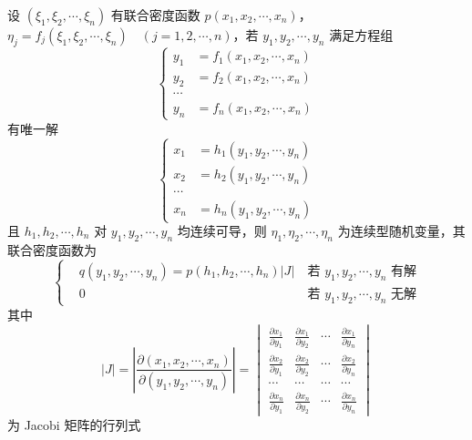 \documentclass[12pt,a4paper]{amsart}
\begin{document}
\begin{proposition}
    设 $(\xi_1, \xi_2, \cdots, \xi_n)$ 有联合密度函数 $p(x_1, x_2, \cdots, x_n)$，$\eta_j = f_j(\xi_1, \xi_2, \cdots, \xi_n)\quad(j = 1,2, \cdots, n)$，若 $y_1, y_2, \cdots, y_n$ 满足方程组
    \begin{equation}
        \left\{
        \begin{aligned}
            y_1 &= f_1(x_1, x_2, \cdots, x_n) \\
            y_2 &= f_2(x_1, x_2, \cdots, x_n) \\
            \cdots \\
            y_n &= f_n(x_1, x_2, \cdots, x_n)
        \end{aligned}
        \right.
    \end{equation}
    有唯一解
    \begin{equation}
        \left\{
        \begin{aligned}
            x_1 &= h_1(y_1, y_2, \cdots, y_n) \\
            x_2 &= h_2(y_1, y_2, \cdots, y_n) \\
            \cdots \\
            x_n &= h_n(y_1, y_2, \cdots, y_n)
        \end{aligned}
        \right.
    \end{equation}
    且 $h_1, h_2, \cdots, h_n$ 对 $y_1, y_2, \cdots, y_n$ 均连续可导，则 $\eta_1, \eta_2, \cdots, \eta_n$ 为连续型随机变量，其联合密度函数为
    \begin{equation}
        \left\{
        \begin{aligned}
            &q(y_1, y_2, \cdots, y_n) = p(h_1, h_2, \cdots, h_n)|J|~&\text{若 $y_1, y_2, \cdots, y_n$ 有解} \\
            &0~&\text{若 $y_1, y_2, \cdots, y_n$ 无解}
        \end{aligned}
        \right.
    \end{equation}
    其中
    \begin{equation}
        |J| = \left|\frac{\partial(x_1, x_2, \cdots, x_n)}{\partial(y_1, y_2, \cdots, y_n)}\right| = \begin{vmatrix}
            \frac{\partial x_1}{\partial y_1} & \frac{\partial x_1}{\partial y_2} & \cdots & \frac{\partial x_1}{\partial y_n} \\
            \frac{\partial x_2}{\partial y_1} & \frac{\partial x_2}{\partial y_2} & \cdots & \frac{\partial x_2}{\partial y_n} \\
            \cdots & \cdots & \cdots & \cdots \\
            \frac{\partial x_n}{\partial y_1} & \frac{\partial x_n}{\partial y_2} & \cdots & \frac{\partial x_n}{\partial y_n}
        \end{vmatrix}
    \end{equation}
    为 Jacobi 矩阵的行列式
\end{proposition}
\end{document}
